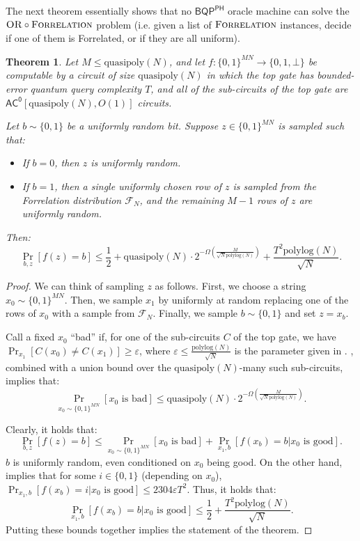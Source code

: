 \documentclass[10pt,a4paper]{article}
\newtheorem{theorem}{Theorem}
\newcommand{\eps}{\varepsilon}
\newcommand{\polylog}{\mathrm{polylog}}
\newcommand{\quasipoly}{\mathrm{quasipoly}}
\newcommand{\OR}{\normalfont\textsc{OR}}
\newcommand{\Forrelation}{\normalfont\textsc{Forrelation}}
\begin{document}
The next theorem essentially shows that no $\mathsf{BQP}^\mathsf{PH}$ oracle machine can solve the $\OR \circ \Forrelation$ problem (i.e. given a list of $\Forrelation$ instances, decide if one of them is Forrelated, or if they are all uniform).

\begin{theorem}
\label{thm:bqp_ac0_single_forrelated_block_indistinguishable}
Let $M \le \quasipoly(N)$, and let $f: \{0,1\}^{MN} \to \{0,1,\bot\}$ be computable by a circuit of size $\quasipoly(N)$ in which the top gate has bounded-error quantum query complexity $T$, and all of the sub-circuits of the top gate are $\mathsf{AC^0}[\quasipoly(N), O(1)]$ circuits.

Let $b \sim \{0,1\}$ be a uniformly random bit. Suppose $z \in \{0,1\}^{MN}$ is sampled such that:
\begin{itemize}
\item If $b = 0$, then $z$ is uniformly random.
\item If $b = 1$, then a single uniformly chosen row of $z$ is sampled from the Forrelation distribution $\mathcal{F}_N$, and the remaining $M - 1$ rows of $z$ are uniformly random.
\end{itemize}
Then:
\[
\Pr_{b, z} [f(z) = b] \le \frac{1}{2} + \quasipoly(N) \cdot 2^{-\Omega\left(\frac{M}{\sqrt{N} \polylog(N)}\right)} + \frac{T^2 \polylog(N)}{\sqrt{N}}.
\]
\end{theorem}
\begin{proof}
We can think of sampling $z$ as follows. First, we choose a string $x_0 \sim \{0,1\}^{MN}$. Then, we sample $x_1$ by uniformly at random replacing one of the rows of $x_0$ with a sample from $\mathcal{F}_N$. Finally, we sample $b \sim \{0,1\}$ and set $z = x_b$.

Call a fixed $x_0$ ``bad'' if, for one of the sub-circuits $C$ of the top gate, we have $\Pr_{x_1}[C(x_0) \neq C(x_1)] \ge \eps$, where $\eps \le \frac{\polylog(N)}{\sqrt{N}}$ is the parameter given in . , combined with a union bound over the $\quasipoly(N)$-many such sub-circuits, implies that:
\[
\Pr_{x_0 \sim \{0,1\}^{MN}}\left[x_0 \text{ is bad}\right] \le \quasipoly(N) \cdot 2^{-\Omega\left(\frac{M}{\sqrt{N} \polylog(N)}\right)}.
\]

Clearly, it holds that:
\[
\Pr_{b,z}[f(z) = b] \le \Pr_{x_0 \sim \{0,1\}^{MN}}\left[x_0 \text{ is bad}\right] + \Pr_{x_1,b}\left[f(x_b) = b | x_0 \text{ is good} \right].
\]
$b$ is uniformly random, even conditioned on $x_0$ being good. On the other hand,  implies that for some $i \in \{0,1\}$ (depending on $x_0$), $\Pr_{x_1,b}\left[f(x_b) = i | x_0 \text{ is good} \right] \le 2304\eps T^2$. Thus, it holds that:
\[
\Pr_{x_1,b}\left[f(x_b) = b | x_0 \text{ is good} \right] \le \frac{1}{2} + \frac{T^2 \polylog(N)}{\sqrt{N}}.
\]
Putting these bounds together implies the statement of the theorem.
\end{proof}
\end{document}
